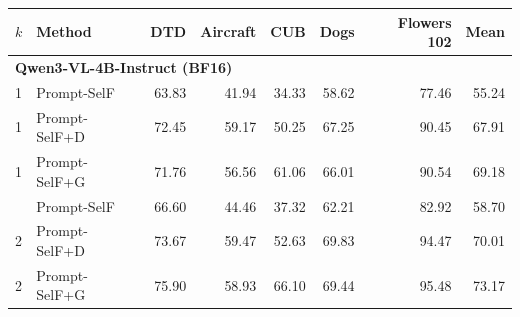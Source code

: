 \begin{tabular}{llrrrrrr}
\toprule
$k$ & Method & DTD & Aircraft & CUB & Dogs & Flowers 102 & Mean \\
\midrule
\multicolumn{8}{l}{\textbf{Qwen3-VL-4B-Instruct (BF16)}} \\
1 & Prompt-SelF & 63.83 & 41.94 & 34.33 & 58.62 & 77.46 & 55.24 \\
1 & Prompt-SelF+D & 72.45 & 59.17 & 50.25 & 67.25 & 90.45 & 67.91 \\
1 & Prompt-SelF+G & 71.76 & 56.56 & 61.06 & 66.01 & 90.54 & 69.18 \\
\addlinespace[2pt]
2 & Prompt-SelF & 66.60 & 44.46 & 37.32 & 62.21 & 82.92 & 58.70 \\
2 & Prompt-SelF+D & 73.67 & 59.47 & 52.63 & 69.83 & 94.47 & 70.01 \\
2 & Prompt-SelF+G & 75.90 & 58.93 & 66.10 & 69.44 & 95.48 & 73.17 \\
\bottomrule
\end{tabular}

